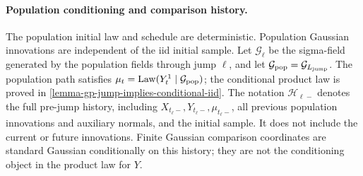 \paragraph{Population conditioning and comparison history.}
The population initial law and schedule are deterministic. Population
Gaussian innovations are independent of the iid initial sample.
Let \(\mathcal G_\ell\) be the sigma-field generated by the population
fields through jump \(\ell\), and let
\(\mathcal G_{\rm pop}=\mathcal G_{L_{\mathrm{jump}}}\).
The population path satisfies
\(\mu_t=\mathrm{Law}(Y_t^1\mid\mathcal G_{\rm pop})\);
the conditional product law is proved in
\cref{lemma-gp-jump-implies-conditional-iid}.
The notation \(\mathcal H_{\ell-}\) denotes the full pre-jump history,
including \(X_{t_\ell-},Y_{t_\ell-},\mu_{t_\ell-}\), all previous
population innovations and auxiliary normals, and the initial sample.
It does not include the current or future innovations. Finite Gaussian comparison
coordinates are standard Gaussian conditionally on this history;
they are not the conditioning object in the product law for \(Y\).

